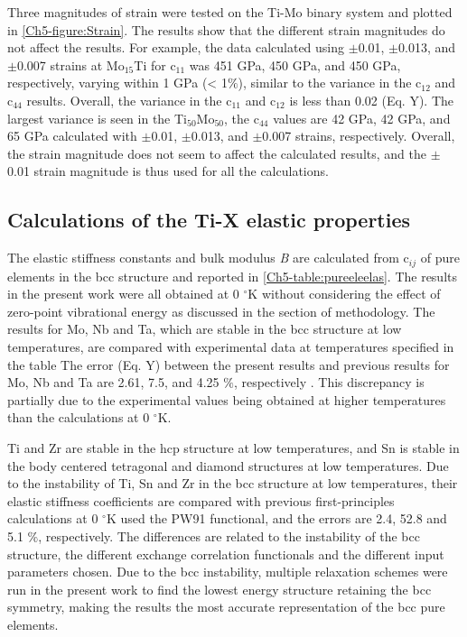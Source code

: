 Three magnitudes of strain were tested on the Ti-Mo binary system and plotted in \ref{Ch5-figure:Strain}. The results show that the different strain magnitudes do not affect the results. For example, the data calculated using $\pm$0.01, $\pm$0.013, and $\pm$0.007 strains at Mo$_{15}$Ti for c$_{11}$ was 451 GPa, 450 GPa, and 450 GPa, respectively, varying within 1 GPa (< 1$\%$), similar to the variance in the c$_{12}$ and c$_{44}$ results. Overall, the variance in the c$_{11}$ and c$_{12}$ is less than 0.02 (Eq. Y). The largest variance is seen in the Ti$_{50}$Mo$_{50}$, the c$_{44}$ values are 42 GPa, 42 GPa, and 65 GPa calculated with $\pm$0.01, $\pm$0.013, and $\pm$0.007 strains, respectively. Overall, the strain magnitude does not seem to affect the calculated results, and the $\pm$0.01 strain magnitude is thus used for all the calculations.

\subsection{Calculations of the Ti-X elastic properties}

The elastic stiffness constants and bulk modulus \textit{B} are calculated from c$_{ij}$ of pure elements in the bcc structure and reported in \ref{Ch5-table:pureeleelas}. The results in the present work were all obtained at 0 $^\circ$K without considering the effect of zero-point vibrational energy as discussed in the section of methodology. The results for Mo, Nb and Ta, which are stable in the bcc structure at low temperatures, are compared with experimental data at temperatures specified in the table \cite{Dickinson1967a,Bolef1961} The error (Eq. Y) between the present results and previous results for Mo, Nb and Ta are 2.61, 7.5, and 4.25 $\%$, respectively \cite{Simmons1971b,Dickinson1967a,Bolef1961}. This discrepancy is partially due to the experimental values being obtained at higher temperatures than the calculations at 0 $^\circ$K. 

Ti and Zr are stable in the hcp structure at low temperatures, and Sn is stable in the body centered tetragonal and diamond structures at low temperatures. Due to the instability of Ti, Sn and Zr in the bcc structure at low temperatures, their elastic stiffness coefficients are compared with previous first-principles calculations at 0 $^\circ$K \cite{Shang2010b} used the PW91 functional, and the errors are 2.4, 52.8 and 5.1 $\%$, respectively. The differences are related to the instability of the bcc structure, the different exchange correlation functionals and the different input parameters chosen. Due to the bcc instability, multiple relaxation schemes were run in the present work to find the lowest energy structure retaining the bcc symmetry, making the results the most accurate representation of the bcc pure elements. 
 

